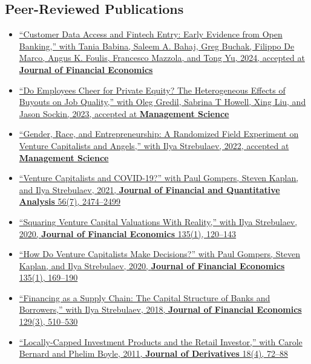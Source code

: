 \documentclass[11pt]{article}
\begin{document}
\subsection*{Peer-Reviewed Publications}
\begin{itemize}[leftmargin=0pt, labelwidth=0cm, ]
    \item \href{https://papers.ssrn.com/sol3/papers.cfm?abstract_id=4071214}{%
        ``Customer Data Access and Fintech Entry: Early Evidence from Open Banking,'' 
        with Tania Babina, Saleem A. Bahaj, Greg Buchak, Filippo De Marco, Angus K. Foulis, Francesco Mazzola, and Tong Yu, 
        2024, accepted at \textbf{Journal of Financial Economics}}

    \item \href{https://papers.ssrn.com/sol3/papers.cfm?abstract_id=3912230}{%
        ``Do Employees Cheer for Private Equity? The Heterogeneous Effects of Buyouts on Job Quality,'' 
        with Oleg Gredil, Sabrina T Howell, Xing Liu, and Jason Sockin, 
        2023, accepted at \textbf{Management Science}}

    \item \href{https://papers.ssrn.com/sol3/papers.cfm?abstract_id=3301982}{%
        ``Gender, Race, and Entrepreneurship: A Randomized Field Experiment on Venture Capitalists and Angels,'' 
        with Ilya Strebulaev, 
        2022, accepted at \textbf{Management Science}}

    \item \href{https://papers.ssrn.com/sol3/papers.cfm?abstract_id=3669345}{%
        ``Venture Capitalists and COVID-19?'' 
        with Paul Gompers, Steven Kaplan, and Ilya Strebulaev, 
        2021, \textbf{Journal of Financial and Quantitative Analysis} 56(7), 2474--2499}

    \item \href{https://papers.ssrn.com/sol3/papers.cfm?abstract_id=2955455}{%
        ``Squaring Venture Capital Valuations With Reality,'' 
        with Ilya Strebulaev, 
        2020, \textbf{Journal of Financial Economics} 135(1), 120--143}

    \item \href{https://papers.ssrn.com/sol3/papers.cfm?abstract_id=2801385}{%
        ``How Do Venture Capitalists Make Decisions?'' 
        with Paul Gompers, Steven Kaplan, and Ilya Strebulaev, 
        2020, \textbf{Journal of Financial Economics} 135(1), 169--190}

    \item \href{https://papers.ssrn.com/sol3/papers.cfm?abstract_id=2347107}{%
        ``Financing as a Supply Chain: The Capital Structure of Banks and Borrowers,'' 
        with Ilya Strebulaev, 
        2018, \textbf{Journal of Financial Economics} 129(3), 510--530}

    \item \href{https://papers.ssrn.com/sol3/papers.cfm?abstract_id=1101796}{%
        ``Locally-Capped Investment Products and the Retail Investor,'' 
        with Carole Bernard and Phelim Boyle, 
        2011, \textbf{Journal of Derivatives} 18(4), 72--88}
\end{itemize}
\end{document}
